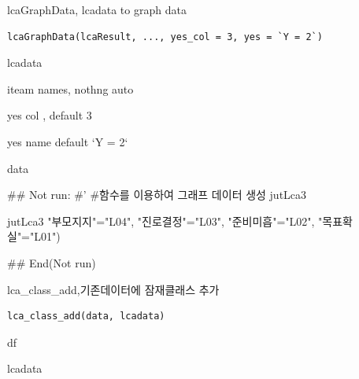 \documentclass[a4paper]{book}
\begin{document}
%
\begin{Description}
lcaGraphData, lcadata to graph data
\end{Description}
%
\begin{Usage}
\begin{verbatim}
lcaGraphData(lcaResult, ..., yes_col = 3, yes = `Y = 2`)
\end{verbatim}
\end{Usage}
%
\begin{Arguments}
\begin{ldescription}
\item[\code{lcaResult}] lcadata

\item[\code{...}] iteam names, nothng auto

\item[\code{yes\_col}] yes col , default 3

\item[\code{yes}] yes name default `Y = 2`
\end{ldescription}
\end{Arguments}
%
\begin{Value}
data
\end{Value}
%
\begin{Examples}
\begin{ExampleCode}
\#\# Not run: 
#'
#함수를 이용하여 그래프 데이터 생성
jutLca3 %

jutLca3 %
                         "부모지지"="L04",
                         "진로결정"="L03",
                         "준비미흡"="L02",
                         "목표확실"="L01")


## End(Not run)

\end{ExampleCode}
\end{Examples}
%
\begin{Description}
lca\_class\_add,기존데이터에 잠재클래스 추가
\end{Description}
%
\begin{Usage}
\begin{verbatim}
lca_class_add(data, lcadata)
\end{verbatim}
\end{Usage}
%
\begin{Arguments}
\begin{ldescription}
\item[\code{data}] df

\item[\code{lcadata}] lcadata
\end{ldescription}
\end{Arguments}
\end{document}
